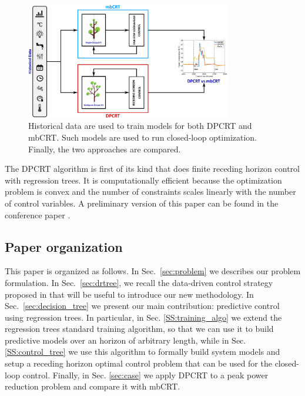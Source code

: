 \begin{figure}[t!]
	\begin{center}
		\hspace{0.8cm}
		\includegraphics[width=0.8\textwidth]{figs/scheme.eps}
		\centering
		\caption{Historical data are used to train models for both DPCRT and mbCRT. Such models are used to run closed-loop optimization. Finally, the two approaches are compared.}
		\label{F:scheme}
		\vspace{-10pt}
	\end{center}
\end{figure}

The DPCRT algorithm is first of its kind that does finite receding horizon control with regression trees. It is computationally efficient because the optimization problem is convex and the number of constraints scales linearly with the number of control variables. \textcolor[rgb]{0.00,0.00,1.00}{A preliminary version of this paper can be found in the conference paper \cite{JainBuildsys2016}.}

\subsection{Paper organization}

\textcolor[rgb]{0.00,0.00,1.00}{This paper is organized as follows. In Sec.~\ref{sec:problem} we describes our problem formulation. In Sec.~\ref{sec:drtree}, we recall the data-driven control strategy proposed in \cite{Behl201630} that will be useful to introduce our new methodology. In Sec.~\ref{sec:decision_tree} we present our main contribution: predictive control using regression trees. In particular, in Sec. \ref{SS:training_algo} we extend the regression trees standard training algorithm, so that we can use it to build predictive models over an horizon of arbitrary length, while in Sec. \ref{SS:control_tree} we use this algorithm to formally build system models and setup a receding horizon optimal control problem that can be used for the closed-loop control. Finally, in Sec. \ref{sec:case} we apply DPCRT to a peak power reduction problem and compare it with mbCRT.}

